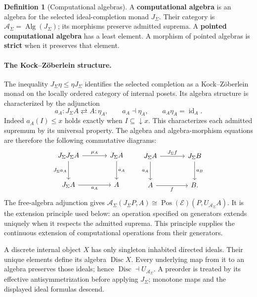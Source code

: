 \documentclass[11pt,a4paper]{article}
\numberwithin{algorithm}{section}
\numberwithin{equation}{section}
\theoremstyle{definition}
\newtheorem{definition}[definition]{Definition}
\theoremstyle{remark}
\theoremstyle{plain}
\newcommand{\E}{\mathcal E}
\newcommand{\AS}{\mathcal A_{\Sigma}}
\newcommand{\J}{J_{\Sigma}}
\newcommand{\id}{\operatorname{id}}
\newcommand{\Pos}{\operatorname{Pos}}
\theoremstyle{definition}
\theoremstyle{plain}
\begin{document}
\begin{definition}[Computational algebras]\label{def:computational-algebras}
A \textbf{computational algebra} is an algebra for the selected
ideal-completion monad $\J$. Their category is
$\AS=\operatorname{Alg}(\J)$; its morphisms preserve admitted
suprema. A \textbf{pointed computational algebra} has a least
element. A morphism of pointed algebras is \textbf{strict} when
it preserves that element.
\end{definition}


\paragraph{The Kock--Z\"oberlein structure.}
The inequality $\J\eta\le\eta\J$ identifies the selected completion
as a Kock--Z\"oberlein monad on the locally ordered category of internal
posets.  Its algebra structure is characterized by the adjunction
\[
 a_A:\J A\rightleftarrows A:\eta_A,\qquad
 a_A\dashv\eta_A,\qquad a_A\eta_A=\id_A.
\]
Indeed $a_A(I)\le x$ holds exactly when $I\subseteq\downarrow x$.
This characterizes each admitted supremum by its universal property.
The algebra and algebra-morphism equations are therefore the following
commutative diagrams:
\begin{equation}\label{eq:cat-kz-algebras}
\begin{tikzcd}[column sep=large,row sep=large]
 \J\J A \arrow[r,"{\mu_A}"] \arrow[d,"{\J a_A}"']
   & \J A \arrow[d,"{a_A}"]\\
 \J A \arrow[r,"{a_A}"'] & A
\end{tikzcd}
\qquad
\begin{tikzcd}[column sep=large,row sep=large]
 \J A \arrow[r,"{\J f}"] \arrow[d,"{a_A}"']
   & \J B \arrow[d,"{a_B}"]\\
 A \arrow[r,"{f}"'] & B .
\end{tikzcd}
\end{equation}
The free-algebra adjunction gives
$\AS(\J P,A)\cong\Pos(\E)(P,U_{\AS}A)$.
It is the extension principle used below: an operation specified on
generators extends uniquely when it respects the admitted suprema.
This principle supplies the continuous extension of computational
operations from their generators.


A discrete internal object $X$ has only singleton inhabited directed
ideals. Their unique elements define its algebra $\operatorname{Disc}X$.
Every underlying map from it to an algebra preserves those ideals;
hence $\operatorname{Disc}\dashv U_{\AS}$.
A preorder is treated by its effective antisymmetrization before applying
$\J$; monotone maps and the displayed ideal formulas descend.
\end{document}
